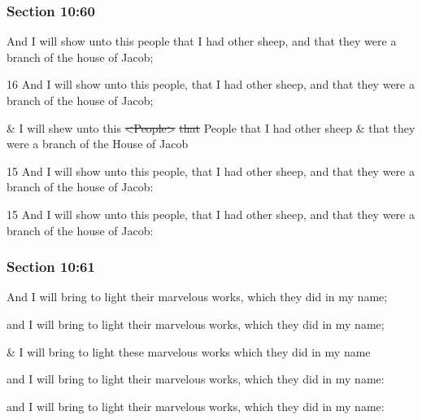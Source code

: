 	\subsubsection{Section 10:60} %
		\label{DC10-60}

		And I will show unto this people that I had other sheep, and that they were a branch of the house of Jacob;

		\begin{framed}
		\scriptsize
			\begin{compactdesc}
				\item[JSP] 16 And I will show unto this people, that I had other sheep, and that they were a branch of the house of Jacob;
				\item[RB1] \& I will shew unto this \sout{<People>} \sout{that} People that I had other sheep \& that they were a branch of the House of Jacob
				\item[DC 1835] 15 And I will show unto this people, that I had other sheep, and that they were a branch of the house of Jacob:
				\item[DC 1844] 15 And I will show unto this people, that I had other sheep, and that they were a branch of the house of Jacob: 
			\end{compactdesc}
		\end{framed}

	\subsubsection{Section 10:61} %
		\label{DC10-61}

		And I will bring to light their marvelous works, which they did in my name;

		\begin{framed}
		\scriptsize
			\begin{compactdesc}
				\item[JSP] and I will bring to light their marvelous works, which they did in my name;
				\item[RB1] \& I will bring to light these marvelous works which they did in my name
				\item[DC 1835] and I will bring to light their marvelous works, which they did in my name:
				\item[DC 1844] and I will bring to light their marvelous works, which they did in my name: 
			\end{compactdesc}
		\end{framed}

